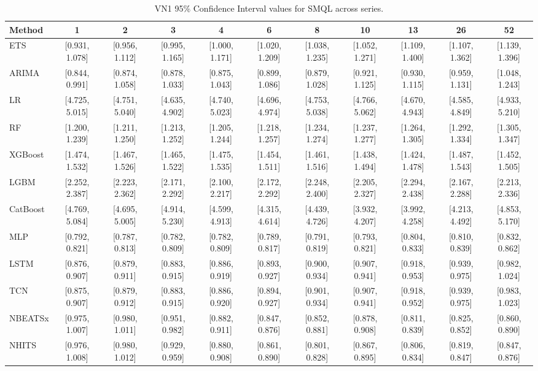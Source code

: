 \begin{table}[!ht]
\centering
\begin{adjustbox}{max width=\textwidth}
\begin{tabular}{lcccccccccc}
\toprule
Method & 1 & 2 & 3 & 4 & 6 & 8 & 10 & 13 & 26 & 52 \\
\midrule
ETS & [0.931, 1.078] & [0.956, 1.112] & [0.995, 1.165] & [1.000, 1.171] & [1.020, 1.209] & [1.038, 1.235] & [1.052, 1.271] & [1.109, 1.400] & [1.107, 1.362] & [1.139, 1.396] \\
ARIMA & [0.844, 0.991] & [0.874, 1.058] & [0.878, 1.033] & [0.875, 1.043] & [0.899, 1.086] & [0.879, 1.028] & [0.921, 1.125] & [0.930, 1.115] & [0.959, 1.131] & [1.048, 1.243] \\
LR & [4.725, 5.015] & [4.751, 5.040] & [4.635, 4.902] & [4.740, 5.023] & [4.696, 4.974] & [4.753, 5.038] & [4.766, 5.062] & [4.670, 4.943] & [4.585, 4.849] & [4.933, 5.210] \\
RF & [1.200, 1.239] & [1.211, 1.250] & [1.213, 1.252] & [1.205, 1.244] & [1.218, 1.257] & [1.234, 1.274] & [1.237, 1.277] & [1.264, 1.305] & [1.292, 1.334] & [1.305, 1.347] \\
XGBoost & [1.474, 1.532] & [1.467, 1.526] & [1.465, 1.522] & [1.475, 1.535] & [1.454, 1.511] & [1.461, 1.516] & [1.438, 1.494] & [1.424, 1.478] & [1.487, 1.543] & [1.452, 1.505] \\
LGBM & [2.252, 2.387] & [2.223, 2.362] & [2.171, 2.292] & [2.100, 2.217] & [2.172, 2.292] & [2.248, 2.400] & [2.205, 2.327] & [2.294, 2.438] & [2.167, 2.288] & [2.213, 2.336] \\
CatBoost & [4.769, 5.084] & [4.695, 5.005] & [4.914, 5.230] & [4.599, 4.913] & [4.315, 4.614] & [4.439, 4.726] & [3.932, 4.207] & [3.992, 4.258] & [4.213, 4.492] & [4.853, 5.170] \\
MLP & [0.792, 0.821] & [0.787, 0.813] & [0.782, 0.809] & [0.782, 0.809] & [0.789, 0.817] & [0.791, 0.819] & [0.793, 0.821] & [0.804, 0.833] & [0.810, 0.839] & [0.832, 0.862] \\
LSTM & [0.876, 0.907] & [0.879, 0.911] & [0.883, 0.915] & [0.886, 0.919] & [0.893, 0.927] & [0.900, 0.934] & [0.907, 0.941] & [0.918, 0.953] & [0.939, 0.975] & [0.982, 1.024] \\
TCN & [0.875, 0.907] & [0.879, 0.912] & [0.883, 0.915] & [0.886, 0.920] & [0.894, 0.927] & [0.901, 0.934] & [0.907, 0.941] & [0.918, 0.952] & [0.939, 0.975] & [0.983, 1.023] \\
NBEATSx & [0.975, 1.007] & [0.980, 1.011] & [0.951, 0.982] & [0.882, 0.911] & [0.847, 0.876] & [0.852, 0.881] & [0.878, 0.908] & [0.811, 0.839] & [0.825, 0.852] & [0.860, 0.890] \\
NHITS & [0.976, 1.008] & [0.980, 1.012] & [0.929, 0.959] & [0.880, 0.908] & [0.861, 0.890] & [0.801, 0.828] & [0.867, 0.895] & [0.806, 0.834] & [0.819, 0.847] & [0.847, 0.876] \\
\bottomrule
\end{tabular}
\end{adjustbox}
\caption{VN1 95\% Confidence Interval values for SMQL across series.}
\label{tab:ci_vn1_scaled_mqloss}
\end{table}

